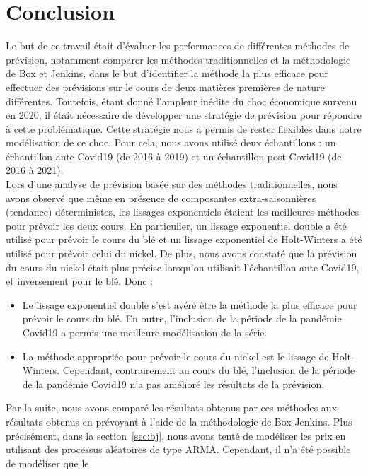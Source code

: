 \section*{Conclusion}
Le but de ce travail était d'évaluer les performances de différentes méthodes de prévision, notamment comparer les méthodes traditionnelles et la méthodologie de Box et 
Jenkins, dans le but d'identifier la méthode la plus efficace pour effectuer des prévisions sur le cours de deux matières premières de nature différentes. Toutefois, étant 
donné l'ampleur inédite du choc économique survenu en 2020, il était nécessaire de développer une stratégie de prévision pour répondre à cette problématique. Cette 
stratégie nous a permis de rester flexibles dans notre modélisation de ce choc. Pour cela, nous avons utilisé deux échantillons : un échantillon ante-Covid19 (de 2016 à 
2019) et un échantillon post-Covid19 (de 2016 à 2021).\\[5pt]
Lors d'une analyse de prévision basée sur des méthodes traditionnelles, nous avons observé que même en présence de composantes extra-saisonnières (tendance) déterministes, 
les lissages exponentiels étaient les meilleures méthodes pour prévoir les deux cours. En particulier, un lissage exponentiel double a été utilisé pour prévoir le cours du 
blé et un lissage exponentiel de Holt-Winters a été utilisé pour prévoir celui du nickel. De plus, nous avons constaté que la prévision du cours du nickel était plus 
précise lorsqu'on utilisait l'échantillon ante-Covid19, et inversement pour le blé. Donc :
\begin{itemize}
    \item Le lissage exponentiel double s'est avéré être la méthode la plus efficace pour prévoir le cours du blé. En outre, l'inclusion de la période de la pandémie 
    Covid19 a permis une meilleure modélisation de la série.
    \item La méthode appropriée pour prévoir le cours du nickel est le lissage de Holt-Winters. Cependant, contrairement au cours du blé, l'inclusion de la période de la 
    pandémie Covid19 n'a pas amélioré les résultats de la prévision.
\end{itemize}
Par la suite, nous avons comparé les résultats obtenus par ces méthodes aux résultats obtenus en prévoyant à l'aide de la méthodologie de Box-Jenkins. Plus précisément, 
dans la section~\ref{sec:bj}, nous avons tenté de modéliser les prix en utilisant des processus aléatoires de type ARMA. Cependant, il n'a été possible de modéliser que le 
